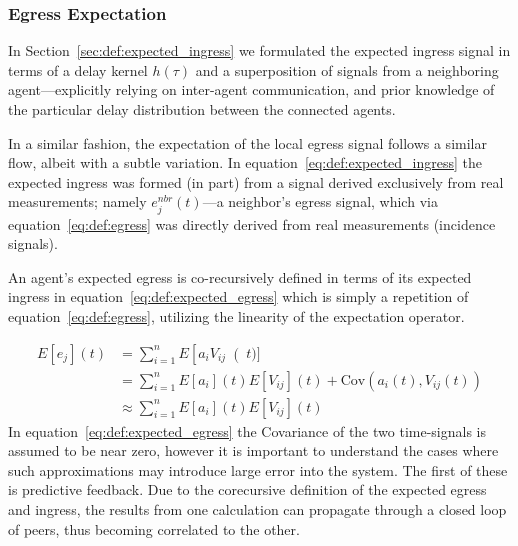 \documentclass{report}
\begin{document}
\subsubsection{Egress Expectation}
\label{sec:def:expected_egress}

In Section~\ref{sec:def:expected_ingress} we formulated the expected ingress signal in terms of a delay kernel $h(\tau)$ and a superposition of signals from a neighboring agent---explicitly relying on inter-agent communication, and prior knowledge of the particular delay distribution between the connected agents.

In a similar fashion, the expectation of the local egress signal follows a similar flow, albeit with a subtle variation.
In equation~\eqref{eq:def:expected_ingress} the expected ingress was formed (in part) from a signal derived exclusively from real measurements; namely $e^{nbr}_j(t)$---a neighbor's egress signal, which via equation~\eqref{eq:def:egress} was directly derived from real measurements (incidence signals).

An agent's expected egress is co-recursively defined in terms of its expected ingress in equation~\eqref{eq:def:expected_egress} which is simply a repetition of equation~\eqref{eq:def:egress}, utilizing the linearity of the expectation operator.


\begin{align}\label{eq:def:expected_egress}
	E\left[e_j\right](t) &= \sum_{i=1}^n E\left[a_i V_{ij}\right(t)]\\
						&= \sum_{i=1}^n E\left[a_i\right](t) E\left[V_{ij}\right](t) + \mbox{Cov}(a_i(t), V_{ij}(t))\\
						&\approx \sum_{i=1}^n  E\left[a_i\right](t) E\left[V_{ij}\right](t)
\end{align}
In equation~\eqref{eq:def:expected_egress} the Covariance of the two time-signals is assumed to be near zero, however it is important to understand the cases where such approximations may introduce large error into the system.
The first of these is predictive feedback.
Due to the corecursive definition of the expected egress and ingress, the results from one calculation can propagate through a closed loop of peers, thus becoming correlated to the other.
\end{document}
